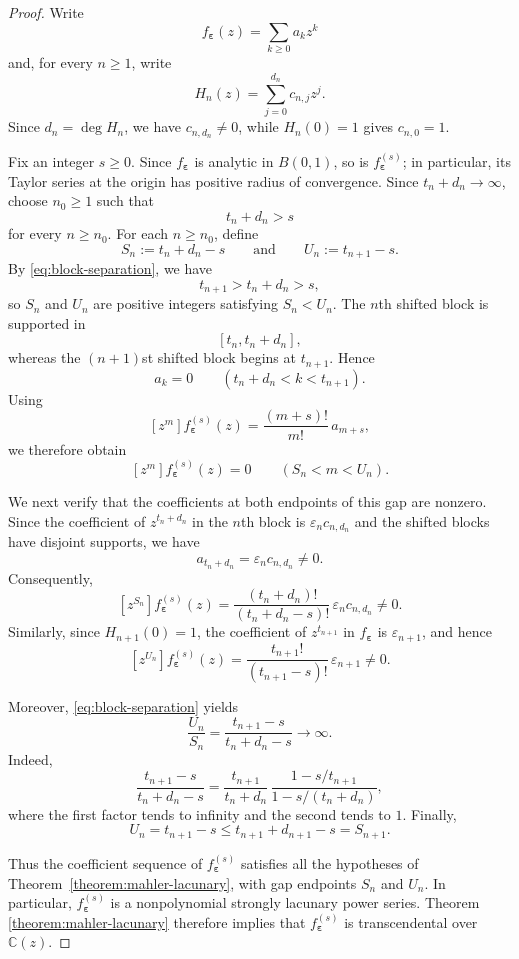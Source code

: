 \documentclass[10pt,a4paper]{amsart}
\numberwithin{equation}{section}
\newcommand{\C}{\mathbb C}
\begin{document}
\begin{proof}
Write
\[
f_{\boldsymbol{\varepsilon}}(z)
=
\sum_{k\geq 0}a_kz^k
\]
and, for every $n\geq 1$, write
\[
H_n(z)
=
\sum_{j=0}^{d_n}c_{n,j}z^j.
\]
Since $d_n=\deg H_n$, we have $c_{n,d_n}\neq 0$, while
$H_n(0)=1$ gives $c_{n,0}=1$.

Fix an integer $s\geq 0$. Since $f_{\boldsymbol{\varepsilon}}$ is
analytic in $B(0,1)$, so is $f_{\boldsymbol{\varepsilon}}^{(s)}$; in
particular, its Taylor series at the origin has positive radius of
convergence. Since $t_n+d_n\to\infty$, choose $n_0\geq 1$ such that
\[
t_n+d_n>s
\]
for every $n\geq n_0$. For each $n\geq n_0$, define
\[
S_n:=t_n+d_n-s
\qquad\text{and}\qquad
U_n:=t_{n+1}-s.
\]
By \eqref{eq:block-separation}, we have
\[
t_{n+1}>t_n+d_n>s,
\]
so $S_n$ and $U_n$ are positive integers satisfying $S_n<U_n$. The $n$th shifted block is supported in
\[
[t_n,t_n+d_n],
\]
whereas the $(n+1)$st shifted block begins at $t_{n+1}$. Hence
\[
a_k=0
\qquad
(t_n+d_n<k<t_{n+1}).
\]
Using
\[
[z^m]f_{\boldsymbol{\varepsilon}}^{(s)}(z)
=
\frac{(m+s)!}{m!}\,a_{m+s},
\]
we therefore obtain
\[
[z^m]f_{\boldsymbol{\varepsilon}}^{(s)}(z)=0
\qquad
(S_n<m<U_n).
\]

We next verify that the coefficients at both endpoints of this gap are
nonzero. Since the coefficient of $z^{t_n+d_n}$ in the $n$th block is
$\varepsilon_n c_{n,d_n}$ and the shifted blocks have disjoint supports,
we have
\[
a_{t_n+d_n}
=
\varepsilon_n c_{n,d_n}
\neq 0.
\]
Consequently,
\[
[z^{S_n}]f_{\boldsymbol{\varepsilon}}^{(s)}(z)
=
\frac{(t_n+d_n)!}{(t_n+d_n-s)!}\,
\varepsilon_n c_{n,d_n}
\neq 0.
\]
Similarly, since $H_{n+1}(0)=1$, the coefficient of $z^{t_{n+1}}$ in
$f_{\boldsymbol{\varepsilon}}$ is $\varepsilon_{n+1}$, and hence
\[
[z^{U_n}]f_{\boldsymbol{\varepsilon}}^{(s)}(z)
=
\frac{t_{n+1}!}{(t_{n+1}-s)!}\,
\varepsilon_{n+1}
\neq 0.
\]

Moreover, \eqref{eq:block-separation} yields
\[
\frac{U_n}{S_n}
=
\frac{t_{n+1}-s}{t_n+d_n-s}
\longrightarrow\infty.
\]
Indeed,
\[
\frac{t_{n+1}-s}{t_n+d_n-s}
=
\frac{t_{n+1}}{t_n+d_n}
\,
\frac{1-s/t_{n+1}}{1-s/(t_n+d_n)},
\]
where the first factor tends to infinity and the second tends to $1$.
Finally,
\[
U_n
=
t_{n+1}-s
\leq
t_{n+1}+d_{n+1}-s
=
S_{n+1}.
\]

Thus the coefficient sequence of
$f_{\boldsymbol{\varepsilon}}^{(s)}$ satisfies all the hypotheses of
Theorem~\ref{theorem:mahler-lacunary}, with gap endpoints $S_n$ and
$U_n$. In particular, $f_{\boldsymbol{\varepsilon}}^{(s)}$ is a
nonpolynomial strongly lacunary power series. Theorem
\ref{theorem:mahler-lacunary} therefore implies that
$f_{\boldsymbol{\varepsilon}}^{(s)}$ is transcendental over $\C(z)$.
\end{proof}
\end{document}
